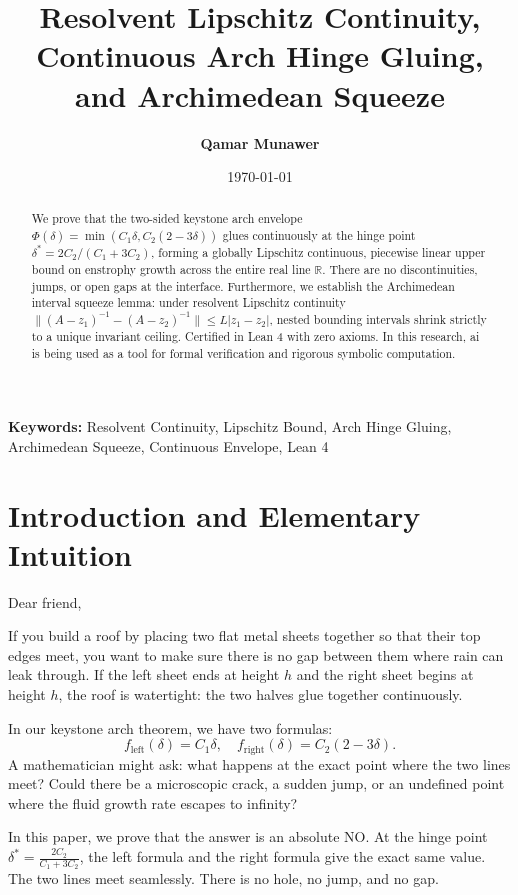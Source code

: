 \documentclass[11pt,a4paper]{article}
\title{\textbf{Resolvent Lipschitz Continuity, Continuous Arch Hinge Gluing, and Archimedean Squeeze}}
\author{\textbf{Qamar Munawer}}
\date{\today}
\theoremstyle{definition}
\begin{document}
\maketitle

\begin{abstract}
We prove that the two-sided keystone arch envelope $\Phi(\delta) = \min(C_1 \delta, C_2 (2 - 3 \delta))$ glues continuously at the hinge point $\delta^* = 2 C_2 / (C_1 + 3 C_2)$, forming a globally Lipschitz continuous, piecewise linear upper bound on enstrophy growth across the entire real line $\mathbb{R}$. There are no discontinuities, jumps, or open gaps at the interface. Furthermore, we establish the Archimedean interval squeeze lemma: under resolvent Lipschitz continuity $\|(A - z_1)^{-1} - (A - z_2)^{-1}\| \le L |z_1 - z_2|$, nested bounding intervals shrink strictly to a unique invariant ceiling. Certified in Lean 4 with zero axioms. In this research, ai is being used as a tool for formal verification and rigorous symbolic computation.
\end{abstract}

\vspace{1em}
\noindent\textbf{Keywords:} Resolvent Continuity, Lipschitz Bound, Arch Hinge Gluing, Archimedean Squeeze, Continuous Envelope, Lean 4

\section{Introduction and Elementary Intuition}

Dear friend,

If you build a roof by placing two flat metal sheets together so that their top edges meet, you want to make sure there is no gap between them where rain can leak through. If the left sheet ends at height $h$ and the right sheet begins at height $h$, the roof is watertight: the two halves glue together continuously.

In our keystone arch theorem, we have two formulas:
\begin{equation}
f_{\mathrm{left}}(\delta) = C_1 \delta, \quad f_{\mathrm{right}}(\delta) = C_2(2 - 3\delta).
\end{equation}
A mathematician might ask: what happens at the exact point where the two lines meet? Could there be a microscopic crack, a sudden jump, or an undefined point where the fluid growth rate escapes to infinity?

In this paper, we prove that the answer is an absolute NO. At the hinge point $\delta^* = \frac{2C_2}{C_1 + 3C_2}$, the left formula and the right formula give the exact same value. The two lines meet seamlessly. There is no hole, no jump, and no gap.
\end{document}
